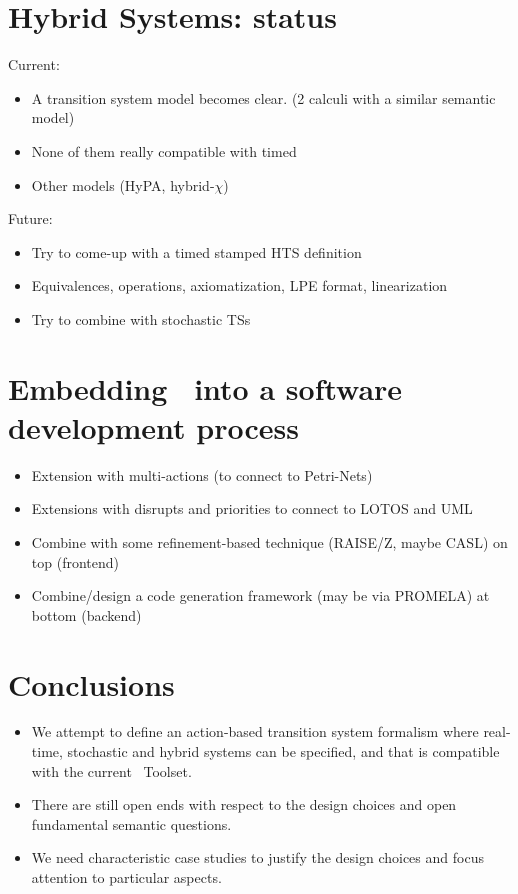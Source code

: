 \begin{slide}
\newslide\section*{Hybrid Systems: status}
Current:
\begin{itemize}
\item A transition system model becomes clear. (2 calculi with a similar semantic model)
\item None of them really compatible with timed \mcrl
\item Other models (HyPA, hybrid-$\chi$)
\end{itemize}
\pause
Future:
\begin{itemize}
\item Try to come-up with a timed stamped HTS definition
\item Equivalences, operations, axiomatization, LPE format, linearization
\item Try to combine with stochastic TSs
\end{itemize}
\newslide\section*{Embedding \mcrl\ into a software development process}
\begin{itemize}
\item Extension with multi-actions (to connect to Petri-Nets)
\item Extensions with disrupts and priorities to connect to LOTOS and UML
\item Combine with some refinement-based technique (RAISE/Z, maybe CASL) on top (frontend)
\item Combine/design a code generation framework (may be via PROMELA) at bottom (backend)
\end{itemize}
\newslide\section*{Conclusions}
\begin{itemize}
\item We attempt to define an action-based transition system formalism
where real-time, stochastic and hybrid systems can be specified,
and that is compatible with the current \mcrl\ Toolset.
\pause
\item There are still open ends with respect to the design choices
and open fundamental semantic questions.
\pause
\item We need characteristic case studies to justify the design choices
and focus attention to particular aspects.
\end{itemize}


\end{slide}

